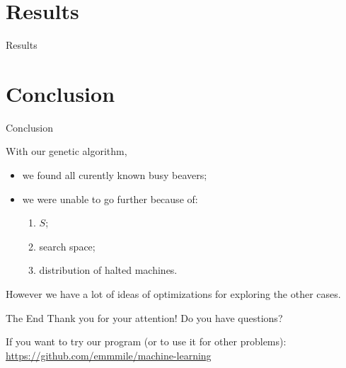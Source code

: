\documentclass{beamer}
\begin{document}
\section{Results}

\begin{frame}{Results}
\begin{center}
\end{center}
\end{frame}

\section{Conclusion}

\begin{frame}{Conclusion}

  With our genetic algorithm,
  \begin{itemize}
  \item we found all curently known busy beavers;
  \item we were unable to go further because of:
    \begin{enumerate}
    \item $S$;
    \item search space;
    \item distribution of halted machines.
    \end{enumerate}
  \end{itemize}

  \vspace{1cm} %
  However we have a lot of ideas of optimizations for exploring the other cases.
\end{frame}

\begin{frame}{The End}
  Thank you for your attention!
  Do you have questions?

  \vspace{2cm} %

  If you want to try our program (or to use it for other problems):
  \url{https://github.com/emmmile/machine-learning}
\end{frame}
\end{document}

